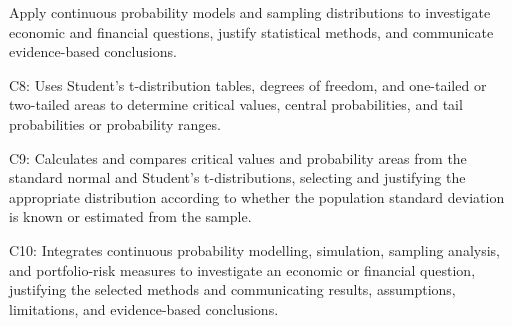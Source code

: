 \makeatletter
{}
\makeatother

\graphicspath{{./}{../}{../../}{../../../}{../../../../}{preamble/}{../preamble/}{../../preamble/}{../../../preamble/}{../../../../preamble/}}
\linespread{1.0}
\setlength{\parskip}{3pt}
\setlength{\fboxsep}{0pt}


\vspace{0.15cm}

\LearningObjective
{Apply continuous probability models and sampling distributions to investigate economic and financial questions, justify statistical methods, and communicate evidence-based conclusions.}
{
C8: Uses Student's t-distribution tables, degrees of freedom, and one-tailed or two-tailed areas to determine critical values, central probabilities, and tail probabilities or probability ranges.\par
C9: Calculates and compares critical values and probability areas from the standard normal and Student's t-distributions, selecting and justifying the appropriate distribution according to whether the population standard deviation is known or estimated from the sample.\par
C10: Integrates continuous probability modelling, simulation, sampling analysis, and portfolio-risk measures to investigate an economic or financial question, justifying the selected methods and communicating results, assumptions, limitations, and evidence-based conclusions.
}

\vspace{0.1cm}
\StudentInfo

